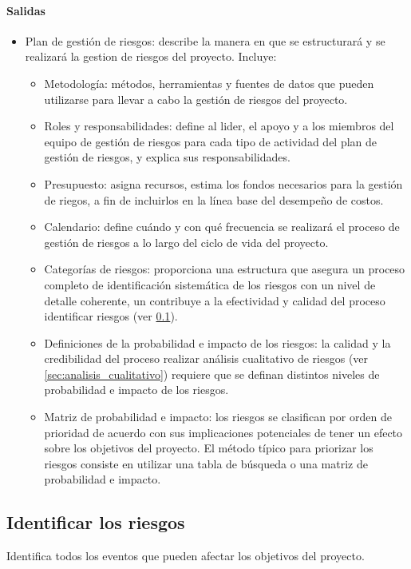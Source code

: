 \documentclass[a4paper,twosides]{article}
\newlength{\wideitemsep}
\let\olditem\item
\renewcommand{\item}{\setlength{\itemsep}{\wideitemsep}\olditem}
\begin{document}
\paragraph{Salidas}
\begin{itemize}
\item Plan de gestión de riesgos: describe la manera en que se estructurará y se realizará la gestion de riesgos del proyecto. Incluye:
\begin{itemize}
\item Metodología: métodos, herramientas y fuentes de datos que pueden utilizarse para llevar a cabo la gestión de riesgos del proyecto.
\item Roles y responsabilidades: define al lider, el apoyo y a los miembros del equipo de gestión de riesgos para cada tipo de actividad del plan de gestión de riesgos, y explica sus responsabilidades.
\item Presupuesto: asigna recursos, estima los fondos necesarios para la gestión de riegos, a fin de incluirlos en la línea base del desempeño de costos.
\item Calendario: define cuándo y con qué frecuencia se realizará el proceso de gestión de riesgos a lo largo del ciclo de vida del proyecto.
\item Categorías de riesgos: proporciona una estructura que asegura un proceso completo de identificación sistemática de los riesgos con un nivel de detalle coherente, un contribuye a la efectividad y calidad del proceso identificar riesgos (ver \ref{sec:identificar_riesgos}).
\item Definiciones de la probabilidad e impacto de los riesgos: la calidad y la credibilidad del proceso realizar análisis cualitativo de riesgos (ver \ref{sec:analisis_cualitativo}) requiere que se definan distintos niveles de probabilidad e impacto de los riesgos.
\item Matriz de probabilidad e impacto: los riesgos se clasifican por orden de prioridad de acuerdo con sus implicaciones potenciales de tener un efecto sobre los objetivos del proyecto. El método típico para priorizar los riesgos consiste en utilizar una tabla de búsqueda o una matriz de probabilidad e impacto.
\end{itemize}
\end{itemize}

\subsection{Identificar los riesgos} \label{sec:identificar_riesgos}
Identifica todos los eventos que pueden afectar los objetivos del proyecto.
\end{document}
